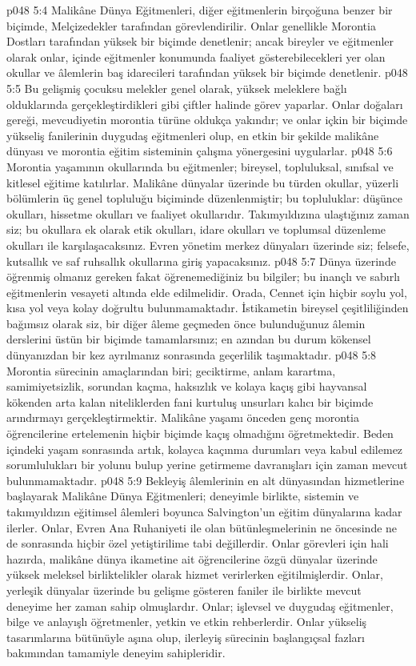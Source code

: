 \vs p048 5:4 Malikâne Dünya Eğitmenleri, diğer eğitmenlerin birçoğuna benzer bir biçimde, Melçizedekler tarafından görevlendirilir. Onlar genellikle Morontia Dostları tarafından yüksek bir biçimde denetlenir; ancak bireyler ve eğitmenler olarak onlar, içinde eğitmenler konumunda faaliyet gösterebilecekleri yer olan okullar ve âlemlerin baş idarecileri tarafından yüksek bir biçimde denetlenir.
\vs p048 5:5 Bu gelişmiş çocuksu melekler genel olarak, yüksek meleklere bağlı olduklarında gerçekleştirdikleri gibi çiftler halinde görev yaparlar. Onlar doğaları gereği, mevcudiyetin morontia türüne oldukça yakındır; ve onlar içkin bir biçimde yükseliş fanilerinin duygudaş eğitmenleri olup, en etkin bir şekilde malikâne dünyası ve morontia eğitim sisteminin çalışma yönergesini uygularlar.
\vs p048 5:6 Morontia yaşamının okullarında bu eğitmenler; bireysel, topluluksal, sınıfsal ve kitlesel eğitime katılırlar. Malikâne dünyalar üzerinde bu türden okullar, yüzerli bölümlerin üç genel topluluğu biçiminde düzenlenmiştir; bu topluluklar: düşünce okulları, hissetme okulları ve faaliyet okullarıdır. Takımyıldızına ulaştığınız zaman siz; bu okullara ek olarak etik okulları, idare okulları ve toplumsal düzenleme okulları ile karşılaşacaksınız. Evren yönetim merkez dünyaları üzerinde siz; felsefe, kutsallık ve saf ruhsallık okullarına giriş yapacaksınız.
\vs p048 5:7 Dünya üzerinde öğrenmiş olmanız gereken fakat öğrenemediğiniz bu bilgiler; bu inançlı ve sabırlı eğitmenlerin vesayeti altında elde edilmelidir. Orada, Cennet için hiçbir soylu yol, kısa yol veya kolay doğrultu bulunmamaktadır. İstikametin bireysel çeşitliliğinden bağımsız olarak siz, bir diğer âleme geçmeden önce bulunduğunuz âlemin derslerini üstün bir biçimde tamamlarsınız; en azından bu durum kökensel dünyanızdan bir kez ayrılmanız sonrasında geçerlilik taşımaktadır.
\vs p048 5:8 Morontia sürecinin amaçlarından biri; geciktirme, anlam karartma, samimiyetsizlik, sorundan kaçma, haksızlık ve kolaya kaçış gibi hayvansal kökenden arta kalan niteliklerden fani kurtuluş unsurları kalıcı bir biçimde arındırmayı gerçekleştirmektir. Malikâne yaşamı önceden genç morontia öğrencilerine ertelemenin hiçbir biçimde kaçış olmadığını öğretmektedir. Beden içindeki yaşam sonrasında artık, kolayca kaçınma durumları veya kabul edilemez sorumlulukları bir yolunu bulup yerine getirmeme davranışları için zaman mevcut bulunmamaktadır.
\vs p048 5:9 Bekleyiş âlemlerinin en alt dünyasından hizmetlerine başlayarak Malikâne Dünya Eğitmenleri; deneyimle birlikte, sistemin ve takımyıldızın eğitimsel âlemleri boyunca Salvington’un eğitim dünyalarına kadar ilerler. Onlar, Evren Ana Ruhaniyeti ile olan bütünleşmelerinin ne öncesinde ne de sonrasında hiçbir özel yetiştirilime tabi değillerdir. Onlar görevleri için hali hazırda, malikâne dünya ikametine ait öğrencilerine özgü dünyalar üzerinde yüksek meleksel birliktelikler olarak hizmet verirlerken eğitilmişlerdir. Onlar, yerleşik dünyalar üzerinde bu gelişme gösteren faniler ile birlikte mevcut deneyime her zaman sahip olmuşlardır. Onlar; işlevsel ve duygudaş eğitmenler, bilge ve anlayışlı öğretmenler, yetkin ve etkin rehberlerdir. Onlar yükseliş tasarımlarına bütünüyle aşına olup, ilerleyiş sürecinin başlangıçsal fazları bakımından tamamiyle deneyim sahipleridir.
